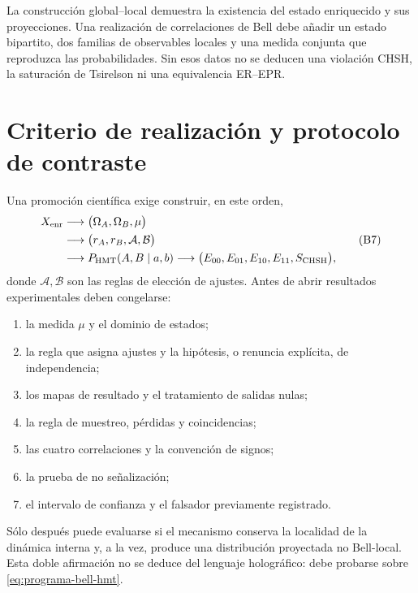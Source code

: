 La construcción global--local demuestra la existencia del estado enriquecido
y sus proyecciones. Una realización de correlaciones de Bell debe añadir un
estado bipartito, dos familias de observables locales y una medida conjunta
que reproduzca las probabilidades. Sin esos datos no se deducen una violación
CHSH, la saturación de Tsirelson ni una equivalencia ER--EPR.

\section{Criterio de realización y protocolo de contraste}
\label{sec:programa-bell-hmt}

Una promoción científica exige construir, en este orden,
\[
\begin{aligned}
X_{\rm enr}
&\longrightarrow
\bigl(\Omega_A,\Omega_B,\mu\bigr)\\
&\longrightarrow
\bigl(r_A,r_B,\mathcal A,\mathcal B\bigr)\\
&\longrightarrow
P_{\rm HMT}(A,B\mid a,b)
\longrightarrow
\bigl(E_{00},E_{01},E_{10},E_{11},S_{\rm CHSH}\bigr),
\end{aligned}
\tag{B7}\label{eq:programa-bell-hmt}
\]
donde \(\mathcal A,\mathcal B\) son las reglas de elección de ajustes. Antes
de abrir resultados experimentales deben congelarse:

\begin{enumerate}
\item la medida \(\mu\) y el dominio de estados;
\item la regla que asigna ajustes y la hipótesis, o renuncia explícita, de
independencia;
\item los mapas de resultado y el tratamiento de salidas nulas;
\item la regla de muestreo, pérdidas y coincidencias;
\item las cuatro correlaciones y la convención de signos;
\item la prueba de no señalización;
\item el intervalo de confianza y el falsador previamente registrado.
\end{enumerate}

Sólo después puede evaluarse si el mecanismo conserva la localidad de la
dinámica interna y, a la vez, produce una distribución proyectada no
Bell-local. Esta doble afirmación no se deduce del lenguaje holográfico: debe
probarse sobre \eqref{eq:programa-bell-hmt}.

